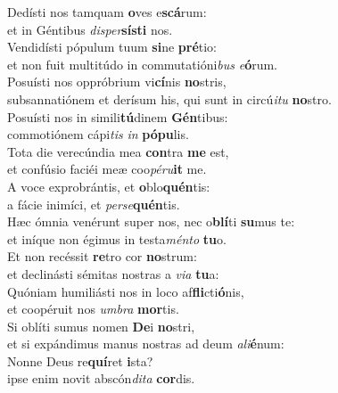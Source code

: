 \oddverse Dedísti nos tamquam \textbf{o}ves e\textbf{scá}rum:~\*\\
\oddverse et in Géntibus \textit{di}\textit{sper}\textbf{sí}\textbf{sti} nos.\\
\evenverse Vendidísti pópulum tuum \textbf{si}ne \textbf{pré}tio:~\*\\
\evenverse et non fuit multitúdo in commutatióni\textit{bus} \textit{e}\textbf{ó}rum.\\
\oddverse Posuísti nos oppróbrium vi\textbf{cí}nis \textbf{no}stris,~\*\\
\oddverse subsannatiónem et derísum his, qui sunt in circú\textit{i}\textit{tu} \textbf{no}stro.\\
\evenverse Posuísti nos in simili\textbf{tú}dinem \textbf{Gén}tibus:~\*\\
\evenverse commotiónem cápi\textit{tis} \textit{in} \textbf{pó}\textbf{pu}lis.\\
\oddverse Tota die verecúndia mea \textbf{con}tra \textbf{me} est,~\*\\
\oddverse et confúsio faciéi meæ coo\textit{pé}\textit{ru}\textbf{it} me.\\
\evenverse A voce exprobrántis, et \textbf{o}blo\textbf{quén}tis:~\*\\
\evenverse a fácie inimíci, et \textit{per}\textit{se}\textbf{quén}tis.\\
\oddverse Hæc ómnia venérunt super nos, nec o\textbf{blí}ti \textbf{su}mus te:~\*\\
\oddverse et iníque non égimus in testa\textit{mén}\textit{to} \textbf{tu}o.\\
\evenverse Et non recéssit \textbf{re}tro cor \textbf{no}strum:~\*\\
\evenverse et declinásti sémitas nostras a \textit{vi}\textit{a} \textbf{tu}a:\\
\oddverse Quóniam humiliásti nos in loco af\textbf{fli}cti\textbf{ó}nis,~\*\\
\oddverse et coopéruit nos \textit{um}\textit{bra} \textbf{mor}tis.\\
\evenverse Si oblíti sumus nomen \textbf{De}i \textbf{no}stri,~\*\\
\evenverse et si expándimus manus nostras ad deum \textit{a}\textit{li}\textbf{é}num:\\
\oddverse Nonne Deus re\textbf{quí}ret \textbf{i}sta?~\*\\
\oddverse ipse enim novit abscón\textit{di}\textit{ta} \textbf{cor}dis.\\
